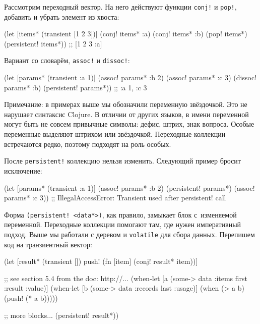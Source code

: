 Рассмотрим переходный вектор. На него действуют функции \verb|conj!| и
\verb|pop!|, добавить и убрать элемент из хвоста:

\begin{english}
  \begin{clojure}
(let [items* (transient [1 2 3])]
  (conj! items* :a)
  (conj! items* :b)
  (pop! items*)
  (persistent! items*))
;; [1 2 3 :a]
  \end{clojure}
\end{english}


\noindent
Вариант со словарём, \verb|assoc!| и \verb|dissoc!|:

\begin{english}
  \begin{clojure}
(let [params* (transient {:a 1})]
  (assoc! params* :b 2)
  (assoc! params* :c 3)
  (dissoc! params* :b)
  (persistent! params*))
;; {:a 1, :c 3}
  \end{clojure}
\end{english}

Примечание: в примерах выше мы обозначили переменную звёздочкой. Это не нарушает
синтаксис Clojure. В отличии от других языков, в имени переменной могут быть не
совсем привычные символы: дефис, штрих, знак вопроса. Особые переменные выделяют
штрихом или звёздочкой. Переходные коллекции встречаются редко, поэтому подходят
на роль особых.

После \verb|persistent!| коллекцию нельзя изменить. Следующий пример бросит
исключение:

\begin{english}
  \begin{clojure}
(let [params* (transient {:a 1})]
  (assoc! params* :b 2)
  (persistent! params*)
  (assoc! params* :c 3))
;; IllegalAccessError: Transient used after persistent! call
  \end{clojure}
\end{english}

Форма \verb|(persistent! <data*>)|, как правило, замыкает блок с~изменяемой
переменной. Переходные коллекции помогают там, где нужен императивный
подход. Выше мы работали с деревом и \verb|volatile| для сбора данных. Перепишем
код на транзиентный вектор:

\begin{english}
  \begin{clojure}
(let [result* (transient [])
      push! (fn [item]
              (conj! result* item))]

  ;; see section 5.4 from the doc: http://...
  (when-let [a (some-> data :items first :result :value)]
    (when-let [b (some-> data :records last :usage)]
      (when (> a b)
        (push! (* a b)))))

  ;; more blocks...
  (persistent! result*))
  \end{clojure}
\end{english}

